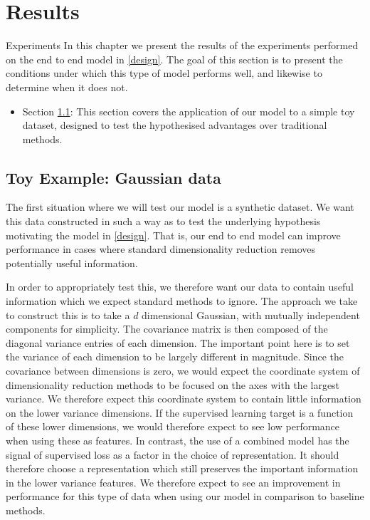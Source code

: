 \chapter{Results}
\label{cha:result}
Experiments 
In this chapter we present the results of the experiments performed on the end to end model in \ref{design}. The goal of this section is to  present the conditions under which this type of model performs well, and likewise to determine when it does not. 

\begin{itemize}
    \item Section \ref{toygauss}: This section covers the application of our model to a simple toy dataset, designed to test the hypothesised advantages over traditional methods.
    
 
\end{itemize} \pagebreak



\section{Toy Example: Gaussian data}
\label{toygauss}
The first situation where we will test our model is a synthetic dataset. We want this data constructed in such a way as to test the underlying hypothesis motivating the model in \ref{design}. That is, our end to end model can improve performance in cases where standard dimensionality reduction removes potentially useful information.

In order to appropriately test this, we therefore want our data to contain useful information which we expect standard methods to ignore. The approach we take to construct this is to take a $d$ dimensional Gaussian, with mutually independent components for simplicity. The covariance matrix is then composed of the diagonal variance entries of each dimension. The important point here is to set the variance of each dimension to be largely different in magnitude. Since the covariance between dimensions is zero, we would expect the coordinate system of dimensionality reduction methods to be focused on the axes with the largest variance. We therefore expect this coordinate system to contain little information on the lower variance dimensions.  If the supervised learning target is a function of these lower dimensions, we would therefore expect to see low performance when using these as features. In contrast, the use of a combined model has the signal of supervised loss as a factor in the choice of representation. It should therefore choose a representation which still preserves the important information in the lower variance features. We therefore expect to see an improvement in performance for this type of data when using our model in comparison to baseline methods.

